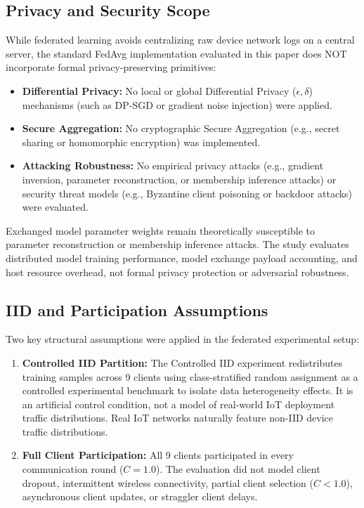 \documentclass[11pt,a4paper]{article}
\begin{document}
\subsection{Privacy and Security Scope}
While federated learning avoids centralizing raw device network logs on a central server, the standard FedAvg implementation evaluated in this paper does NOT incorporate formal privacy-preserving primitives:

\begin{itemize}
    \item \textbf{Differential Privacy:} No local or global Differential Privacy ($\epsilon, \delta$) mechanisms \cite{ref11, ref12} (such as DP-SGD or gradient noise injection) were applied.
    \item \textbf{Secure Aggregation:} No cryptographic Secure Aggregation \cite{ref13} (e.g., secret sharing or homomorphic encryption) was implemented.
    \item \textbf{Attacking Robustness:} No empirical privacy attacks (e.g., gradient inversion, parameter reconstruction, or membership inference attacks) or security threat models (e.g., Byzantine client poisoning \cite{ref14, ref15} or backdoor attacks) were evaluated.
\end{itemize}

Exchanged model parameter weights remain theoretically susceptible to parameter reconstruction or membership inference attacks. The study evaluates distributed model training performance, model exchange payload accounting, and host resource overhead, not formal privacy protection or adversarial robustness.

\subsection{IID and Participation Assumptions}
Two key structural assumptions were applied in the federated experimental setup:

\begin{enumerate}
    \item \textbf{Controlled IID Partition:} The Controlled IID experiment redistributes training samples across 9 clients using class-stratified random assignment as a controlled experimental benchmark to isolate data heterogeneity effects. It is an artificial control condition, not a model of real-world IoT deployment traffic distributions. Real IoT networks naturally feature non-IID device traffic distributions.
    \item \textbf{Full Client Participation:} All 9 clients participated in every communication round ($C = 1.0$). The evaluation did not model client dropout, intermittent wireless connectivity, partial client selection ($C < 1.0$), asynchronous client updates, or straggler client delays.
\end{enumerate}
\end{document}
